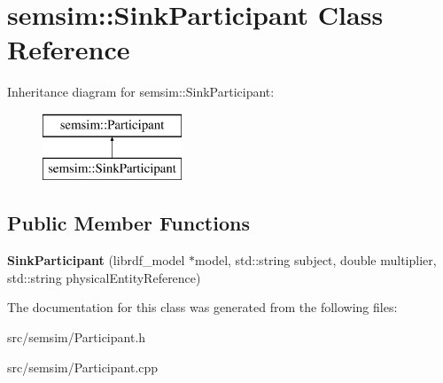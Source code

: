 \hypertarget{classsemsim_1_1SinkParticipant}{}\section{semsim\+:\+:Sink\+Participant Class Reference}
\label{classsemsim_1_1SinkParticipant}
Inheritance diagram for semsim\+:\+:Sink\+Participant\+:\begin{figure}[H]
\begin{center}
\leavevmode
\includegraphics[height=2.000000cm]{classsemsim_1_1SinkParticipant}
\end{center}
\end{figure}
\subsection*{Public Member Functions}
\begin{DoxyCompactItemize}
\item 
\mbox{\label{classsemsim_1_1SinkParticipant_adf61163edf45c215ad1f252d3dbf7490}} 
{\bfseries Sink\+Participant} (librdf\+\_\+model $\ast$model, std\+::string subject, double multiplier, std\+::string physical\+Entity\+Reference)
\end{DoxyCompactItemize}


The documentation for this class was generated from the following files\+:\begin{DoxyCompactItemize}
\item 
src/semsim/Participant.\+h\item 
src/semsim/Participant.\+cpp\end{DoxyCompactItemize}

